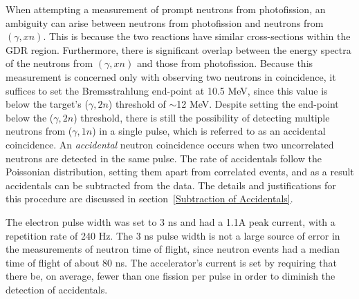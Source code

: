 When attempting a measurement of prompt neutrons from photofission, an ambiguity can arise between neutrons from photofission and neutrons from $(\gamma, xn)$.
This is because the two reactions have similar cross-sections within the GDR region.
Furthermore, there is significant overlap between the energy spectra of the neutrons from $(\gamma, xn)$ and those from photofission.
Because this measurement is concerned only with observing two neutrons in coincidence, it suffices to set the Bremsstrahlung end-point at 10.5 MeV, since this value is below the target's ($\gamma, 2n$) threshold of $\sim$12 MeV.
Despite setting the end-point below the ($\gamma, 2n$) threshold, there is still the possibility of detecting multiple neutrons from ($\gamma, 1n$) in a single pulse, which is referred to as an accidental coincidence.
An \textit{accidental} neutron coincidence occurs when two uncorrelated neutrons are detected in the same pulse.
The rate of accidentals follow the Poissonian distribution, setting them apart from correlated events, and as a result accidentals can be subtracted from the data.
The details and justifications for this procedure are discussed in section~\ref{Subtraction of Accidentals}.

The electron pulse width was set to 3 ns and had a 1.1A peak current, with a repetition rate of 240 Hz.
The 3 ns pulse width is not a large source of error in the measurements of neutron time of flight, since neutron events had a median time of flight of about 80 ns.
The accelerator's current is set by requiring that there be, on average, fewer than one fission per pulse in order to diminish the detection of accidentals.

